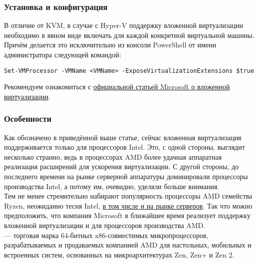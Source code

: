 \documentclass[14pt, a4paper]{article}
\begin{document}
\newpage

\subsubsection*{Установка и конфигурация}

В отличие от KVM, в случае с Hyper-V поддержку вложенной виртуализации необходимо в явном виде
включать для каждой конкретной виртуальной машины. Причём делается это исключительно из
консоли PowerShell от имени администратора следующей командой:
\vspace{0.3cm}
\begin{lstlisting}
Set-VMProcessor -VMName <VMName> -ExposeVirtualizationExtensions $true
\end{lstlisting}
\vspace{0.2cm}

Рекомендуем ознакомиться с \href{https://learn.microsoft.com/en-us/virtualization/hyper-v-on-windows/user-guide/nested-virtualization}{официальной статьей Microsoft о вложенной виртуализации}.

\subsubsection*{Особенности}

Как обозначено в приведённой выше статье, сейчас вложенная виртуализация поддерживается
только для процессоров Intel. Это, с одной стороны, выглядит несколько странно, ведь в процессорах
AMD более удачная аппаратная реализация расширений для ускорения виртуализации. С другой
стороны, до последнего времени на рынке серверной аппаратуры доминировали процессоры
производства Intel, а потому им, очевидно, уделяли больше внимания.\\

Тем не менее стремительно набирают популярность процессоры AMD семейства Ryzen, неожиданно
тесня Intel, \href{https://www.extremetech.com/computing/299191-amds-server-market-share-could-more-than-double-by-the-end-of-2020}{в том числе и на рынке серверов}. Так что можно предположить, что компания Microsoft в
ближайшее время реализует поддержку вложенной виртуализации и для процессоров производства
AMD.\\

\href{https://ru.wikipedia.org/wiki/Ryzen}{} — торговая марка 64-битных x86-совместимых микропроцессоров, разрабатываемых и
продаваемых компанией AMD для настольных, мобильных и встроенных систем, основанных на
микроархитектурах Zen, Zen+ и Zen 2.
\end{document}
